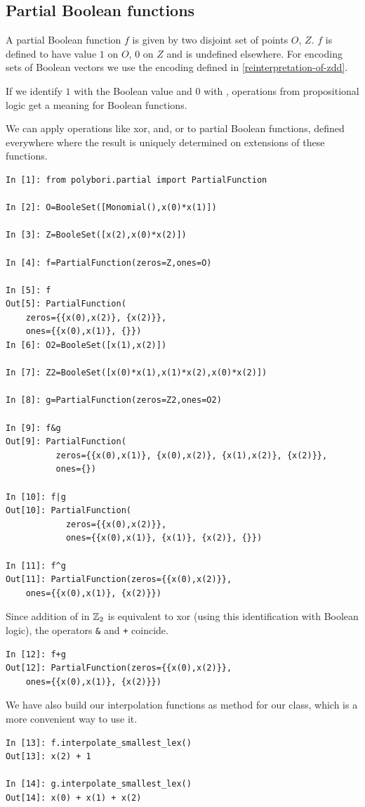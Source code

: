 \subsection{Partial Boolean functions}
A partial Boolean function $f$ is given by two disjoint set of points $O$, $Z$.
$f$ is defined to have value $1$ on $O$, $0$ on $Z$ and is undefined elsewhere.
For encoding sets of Boolean vectors we use the encoding defined in \ref{reinterpretation-of-zdd}.

If we identify $1$ with the Boolean value  and $0$ with ,
operations from propositional logic get a meaning for Boolean functions.

We can apply operations like xor, and, or to partial Boolean functions, defined everywhere where the result is uniquely determined on
extensions of these functions. 

\begin{lstlisting}
In [1]: from polybori.partial import PartialFunction

In [2]: O=BooleSet([Monomial(),x(0)*x(1)])

In [3]: Z=BooleSet([x(2),x(0)*x(2)])

In [4]: f=PartialFunction(zeros=Z,ones=O)

In [5]: f
Out[5]: PartialFunction(
    zeros={{x(0),x(2)}, {x(2)}},
    ones={{x(0),x(1)}, {}})
In [6]: O2=BooleSet([x(1),x(2)])

In [7]: Z2=BooleSet([x(0)*x(1),x(1)*x(2),x(0)*x(2)])

In [8]: g=PartialFunction(zeros=Z2,ones=O2)

In [9]: f&g
Out[9]: PartialFunction(
          zeros={{x(0),x(1)}, {x(0),x(2)}, {x(1),x(2)}, {x(2)}}, 
          ones={})

In [10]: f|g
Out[10]: PartialFunction(
            zeros={{x(0),x(2)}}, 
            ones={{x(0),x(1)}, {x(1)}, {x(2)}, {}})

In [11]: f^g
Out[11]: PartialFunction(zeros={{x(0),x(2)}},
    ones={{x(0),x(1)}, {x(2)}})
\end{lstlisting}

Since addition of in $\mathbb{Z}_2$ is equivalent to xor (using this identification with Boolean logic), the operators \lstinline|&| and \lstinline|+| coincide.
\begin{lstlisting}
In [12]: f+g
Out[12]: PartialFunction(zeros={{x(0),x(2)}}, 
    ones={{x(0),x(1)}, {x(2)}})
\end{lstlisting}

We have also build our interpolation functions as method for our  class, which is a more convenient way to use it.
\begin{lstlisting}
In [13]: f.interpolate_smallest_lex()
Out[13]: x(2) + 1

In [14]: g.interpolate_smallest_lex()
Out[14]: x(0) + x(1) + x(2)
\end{lstlisting}
